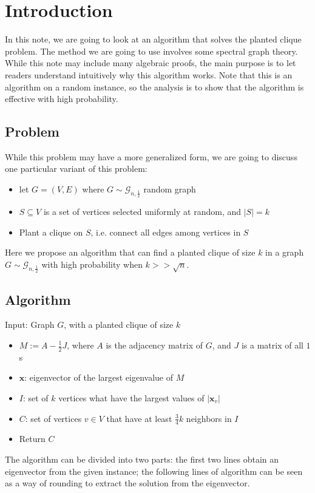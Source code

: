 \documentclass{article}
\begin{document}


\section{Introduction}
In this note, we are going to look at an algorithm that solves the planted
clique problem. The method we are going to use involves some spectral graph
theory. While this note may include many algebraic proofs, the main purpose is
to let readers understand intuitively why this algorithm works. Note that this
is an algorithm on a random instance, so the analysis is to show that the algorithm is effective with high probability. 

\subsection{Problem}
While this problem may have a more generalized form, we are going to discuss
one particular variant of this problem:
\begin{itemize}
    \item let $G = (V, E)$ where $G \sim \mathcal{G}_{n, \frac{1}{2}}$ random graph
    \item $S \subseteq V$ is a set of vertices selected uniformly at random, and $|S| = k$
    \item Plant a clique on $S$, i.e. connect all edges among vertices in $S$
\end{itemize}

Here we propose an algorithm that can find a planted clique of size $k$ in a
graph $G
\sim \mathcal{G}_{n,\frac{1}{2}}$ with high probability when $k >> \sqrt{n}$.

\subsection{Algorithm}
Input: Graph $G$, with a planted clique of size $k$
\begin{itemize}
  \item $M := A - \frac{1}{2}J$, where $A$ is the adjacency matrix of $G$, and
      $J$ is a matrix of all $1$s
  \item $\mathbf{x}$: eigenvector of the largest eigenvalue of $M$
  \item $I$: set of $k$ vertices what have the largest values of $|\mathbf{x}_v|$ 
  \item $C$: set of vertices $v \in V$ that have at least $\frac{3}{4}k$
      neighbors in $I$
  \item Return $C$
\end{itemize}
The algorithm can be divided into two parts: the first two lines obtain an
eigenvector from the given instance; the following lines of algorithm can be
seen as a way of rounding to extract the solution from the eigenvector. 
\end{document}
